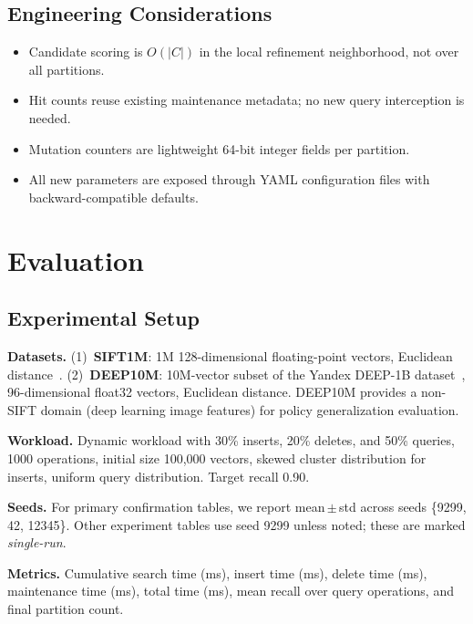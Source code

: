 \documentclass[sigconf, nonacm]{acmart}
\begin{document}
\subsection{Engineering Considerations}

\begin{itemize}[leftmargin=*]
  \item Candidate scoring is $O(|C|)$ in the local refinement
    neighborhood, not over all partitions.
  \item Hit counts reuse existing maintenance metadata; no new query
    interception is needed.
  \item Mutation counters are lightweight 64-bit integer fields per partition.
  \item All new parameters are exposed through YAML configuration files
    with backward-compatible defaults.
\end{itemize}

\section{Evaluation}
\label{sec:evaluation}

\subsection{Experimental Setup}
\label{sec:eval_setup}

\textbf{Datasets.}
(1)~\textbf{SIFT1M}: 1M 128-dimensional floating-point vectors, Euclidean
distance~\cite{jegou2011product}.
(2)~\textbf{DEEP10M}: 10M-vector subset of the Yandex DEEP-1B
dataset~\cite{babenko2016efficient}, 96-dimensional float32 vectors,
Euclidean distance. DEEP10M provides a non-SIFT domain (deep learning
image features) for policy generalization evaluation.

\textbf{Workload.} Dynamic workload with 30\% inserts, 20\% deletes,
and 50\% queries, 1000 operations, initial size 100,000 vectors,
skewed cluster distribution for inserts, uniform query distribution.
Target recall 0.90.

\textbf{Seeds.} For primary confirmation tables, we report
mean\,$\pm$\,std across seeds \{9299, 42, 12345\}. Other experiment
tables use seed 9299 unless noted; these are marked \textit{single-run}.

\textbf{Metrics.} Cumulative search time (ms), insert time (ms),
delete time (ms), maintenance time (ms), total time (ms), mean recall
over query operations, and final partition count.
\end{document}
